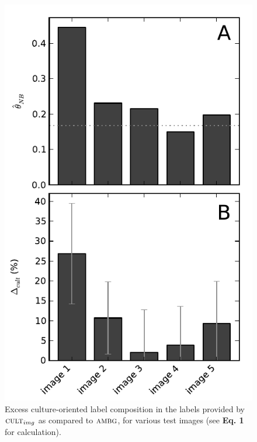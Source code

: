 \documentclass[a4paper]{report}
\begin{document}
\begin{figure}
	\includegraphics{figs/longitudinal_theta_excess-culture.pdf}
	\caption{Excess culture-oriented label composition in the labels provided
		by $\textsc{cult}_{img}$ as compared to $\textsc{ambg}$, for various
		test images (see \textbf{Eq. 1} for calculation).
	}
\end{figure}
\end{document}
